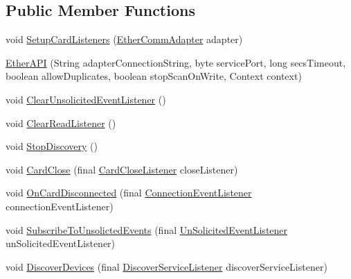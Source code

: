 \subsection*{Public Member Functions}
\begin{DoxyCompactItemize}
\item 
void \mbox{\hyperlink{classcom_1_1ethernom_1_1android_1_1etherapi_1_1_ether_a_p_i_a9785ed6dbf7ce2f95bc22f8aa9908392}{Setup\+Card\+Listeners}} (\mbox{\hyperlink{classcom_1_1ethernom_1_1android_1_1etherapi_1_1link_layer_1_1_ether_comm_adapter}{Ether\+Comm\+Adapter}} adapter)
\item 
\mbox{\hyperlink{classcom_1_1ethernom_1_1android_1_1etherapi_1_1_ether_a_p_i_a728fd002f0533c356fe852b83500b419}{Ether\+A\+PI}} (String adapter\+Connection\+String, byte service\+Port, long secs\+Timeout, boolean allow\+Duplicates, boolean stop\+Scan\+On\+Write, Context context)
\item 
void \mbox{\hyperlink{classcom_1_1ethernom_1_1android_1_1etherapi_1_1_ether_a_p_i_a5333200b5c0642e16df1fa76148d158c}{Clear\+Unsolicited\+Event\+Listener}} ()
\item 
void \mbox{\hyperlink{classcom_1_1ethernom_1_1android_1_1etherapi_1_1_ether_a_p_i_a8586a32236afdebca0f9730412d9e000}{Clear\+Read\+Listener}} ()
\item 
void \mbox{\hyperlink{classcom_1_1ethernom_1_1android_1_1etherapi_1_1_ether_a_p_i_a66b7c9e5106572b803046d2f6d6016a4}{Stop\+Discovery}} ()
\item 
void \mbox{\hyperlink{classcom_1_1ethernom_1_1android_1_1etherapi_1_1_ether_a_p_i_a75a0f23761ba90a058d2df1151e06d2b}{Card\+Close}} (final \mbox{\hyperlink{interfacecom_1_1ethernom_1_1android_1_1etherapi_1_1_card_close_listener}{Card\+Close\+Listener}} close\+Listener)
\item 
void \mbox{\hyperlink{classcom_1_1ethernom_1_1android_1_1etherapi_1_1_ether_a_p_i_af4bf0cd04217e9ffc746a142deefd261}{On\+Card\+Disconnected}} (final \mbox{\hyperlink{interfacecom_1_1ethernom_1_1android_1_1etherapi_1_1_connection_event_listener}{Connection\+Event\+Listener}} connection\+Event\+Listener)
\item 
void \mbox{\hyperlink{classcom_1_1ethernom_1_1android_1_1etherapi_1_1_ether_a_p_i_a730f9d502afbbb8788aada1bf4ae4381}{Subscribe\+To\+Unsolicted\+Events}} (final \mbox{\hyperlink{interfacecom_1_1ethernom_1_1android_1_1etherapi_1_1_un_solicited_event_listener}{Un\+Solicited\+Event\+Listener}} un\+Solicited\+Event\+Listener)
\item 
void \mbox{\hyperlink{classcom_1_1ethernom_1_1android_1_1etherapi_1_1_ether_a_p_i_af98bcd73ca505716754cfe967a1b65fd}{Discover\+Devices}} (final \mbox{\hyperlink{interfacecom_1_1ethernom_1_1android_1_1etherapi_1_1_discover_service_listener}{Discover\+Service\+Listener}} discover\+Service\+Listener)

\end{DoxyCompactItemize}
